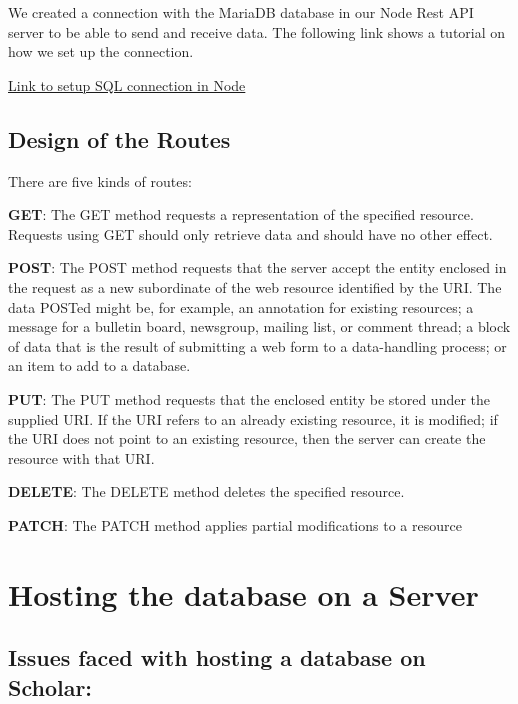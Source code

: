 \documentclass[]{book}
\begin{document}
We created a connection with the MariaDB database in our Node Rest API server to be able to send and receive data. The following link shows a tutorial on how we set up the connection.

\href{https://bezkoder.com/node-js-rest-api-express-mysql/}{Link to setup SQL connection in Node}

\hypertarget{design-of-the-routes}{%
\subsection{Design of the Routes}\label{design-of-the-routes}}

There are five kinds of routes:

\textbf{GET}: The GET method requests a representation of the specified resource. Requests using GET should only retrieve data and should have no other effect.

\textbf{POST}: The POST method requests that the server accept the entity enclosed in the request as a new subordinate of the web resource identified by the URI. The data POSTed might be, for example, an annotation for existing resources; a message for a bulletin board, newsgroup, mailing list, or comment thread; a block of data that is the result of submitting a web form to a data-handling process; or an item to add to a database.

\textbf{PUT}: The PUT method requests that the enclosed entity be stored under the supplied URI. If the URI refers to an already existing resource, it is modified; if the URI does not point to an existing resource, then the server can create the resource with that URI.

\textbf{DELETE}: The DELETE method deletes the specified resource.

\textbf{PATCH}: The PATCH method applies partial modifications to a resource

\hypertarget{hosting-the-database-on-a-server}{%
\section{Hosting the database on a Server}\label{hosting-the-database-on-a-server}}

\hypertarget{issues-faced-with-hosting-a-database-on-scholar}{%
\subsection{Issues faced with hosting a database on Scholar:}\label{issues-faced-with-hosting-a-database-on-scholar}}
\end{document}
